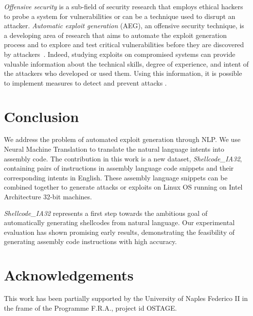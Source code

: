 \documentclass[11pt,a4paper]{article}
\newcommand{\datasetname}[1]{\emph{Shellcode\_IA32}}
\begin{document}
\emph{Offensive security} is a sub-field of security research that employs ethical hackers to probe a system for vulnerabilities or can be a technique used to disrupt an attacker. \emph{Automatic exploit generation} (AEG), an offensive security technique, is a developing area of research that aims to automate the exploit generation process and to explore and test critical vulnerabilities before they are discovered by attackers~\cite{aeg}. Indeed, studying exploits on compromised systems can provide valuable information about the technical skills, degree of experience, and intent of the attackers who developed or used them. Using this information, it is possible to implement measures to detect and prevent attacks \cite{arce2004shellcode}. 
\section{Conclusion}
\label{sec:conclusion}
We address the problem of automated exploit generation through NLP. We use Neural Machine Translation to translate the natural language intents into assembly code.
The contribution in this work is a new dataset, \datasetname{}, containing  pairs of instructions in assembly language code snippets and their corresponding intents in English. These assembly language snippets can be combined together to generate attacks or exploits on Linux OS running on Intel Architecture 32-bit machines.  

\datasetname{} represents a first step towards the ambitious goal of automatically generating shellcodes from natural language. Our experimental evaluation has shown promising early results, demonstrating the feasibility of generating assembly code instructions with high accuracy. 




 

\section*{Acknowledgements}
This work has been partially supported by the University of Naples Federico II in the frame of the Programme F.R.A., project id OSTAGE. 



\end{document}
